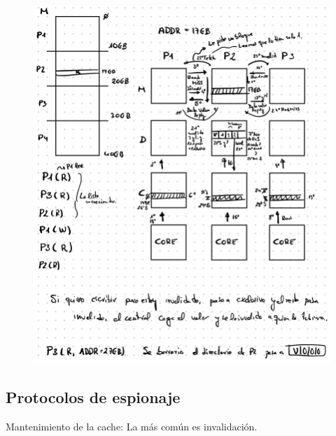 \documentclass[12pt, twoside, openright]{report} %
\begin{document}
\begin{figure}[H]
	{\includegraphics[scale=.3]{Untitled 48.png}}
\end{figure}
\pagebreak
\subsection{Protocolos de espionaje}



    Mantenimiento de la cache: La más común es invalidación.
\end{document}
